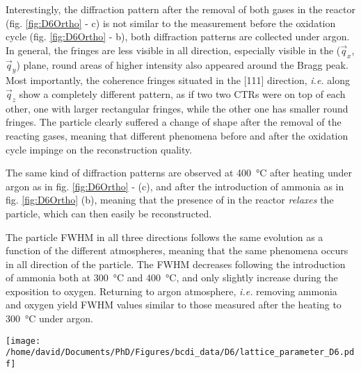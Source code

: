 Interestingly, the diffraction pattern after the removal of both gases in the reactor (fig. \ref{fig:D6Ortho} - c) is not similar to the measurement before the oxidation cycle (fig. \ref{fig:D6Ortho} - b), both diffraction patterns are collected under argon.
In general, the fringes are less visible in all direction, especially visible in the ($\vec{q}_x$, $\vec{q}_y$) plane, round areas of higher intensity also appeared around the Bragg peak.
Most importantly, the coherence fringes situated in the [111] direction, \textit{i.e.} along $\vec{q}_z$ show a completely different pattern, as if two two CTRs were on top of each other, one with larger rectangular fringes, while the other one has smaller round fringes.
The particle clearly suffered a change of shape after the removal of the reacting gases, meaning that different phenomena before and after the oxidation cycle impinge on the reconstruction quality.

The same kind of diffraction patterns are observed at \qty{400}{\degreeCelsius} after heating under argon as in fig. \ref{fig:D6Ortho} - (c), and after the introduction of ammonia as in fig. \ref{fig:D6Ortho} (b), meaning that the presence of  in the reactor \textit{relaxes} the particle, which can then easily be reconstructed.

The particle FWHM in all three directions follows the same evolution as a function of the different atmospheres, meaning that the same phenomena occurs in all direction of the particle.
The FWHM decreases following the introduction of ammonia both at \qty{300}{\degreeCelsius} and \qty{400}{\degreeCelsius}, and only slightly increase during the exposition to oxygen.
Returning to argon atmosphere, \textit{i.e.} removing ammonia and oxygen yield FWHM values similar to those measured after the heating to \qty{300}{\degreeCelsius} under argon.

\begin{SCfigure}
    \centering
    \texttt{[image: /home/david/Documents/PhD/Figures/bcdi\_data/D6/lattice\_parameter\_D6.pdf]}
    \caption{
        Evolution of the interplanar spacing $d_{111}$ and homogeneous strain $\epsilon_{111}$ for particle C as a function of the ammonia to oxygen ratio.
        The reference for the computation of $\epsilon_{111}$ was taken at \qty{25}{\degreeCelsius}.
        The reproduction of measurements at fixed conditions yield multiple data points, lines at \qty{300}{\degreeCelsius} and \qty{400}{\degreeCelsius} link the data points in the order of the measurements.
        No scans were performed at \qty{400}{\degreeCelsius} under Argon after the oxidation cycle.
    }
    \label{fig:D6Latpara}
\end{SCfigure}

